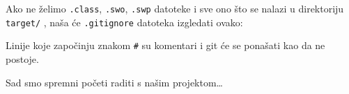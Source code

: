 Ako ne želimo \verb+.class+, \verb+.swo+, \verb+.swp+ datoteke i sve ono što se nalazi u direktoriju \verb+target/+ , naša će \verb+.gitignore+ datoteka izgledati ovako:

\gitoutputcommand{%
\color{gray}{\# Vim privremene datoteke:}\\
\color{black}{*.swp}\\
\color{black}{*.swo}\\
\color{gray}{\# Java kompajlirane klase:}\\
\color{black}{*.class}\\
\color{gray}{\# Output direktorij s rezultatima kompajliranja i builda:}\\
\color{black}{target/*}%
}

Linije koje započinju znakom \verb+#+ su komentari i git će se ponašati kao da ne postoje.

Sad smo spremni početi raditi s našim projektom\dots


